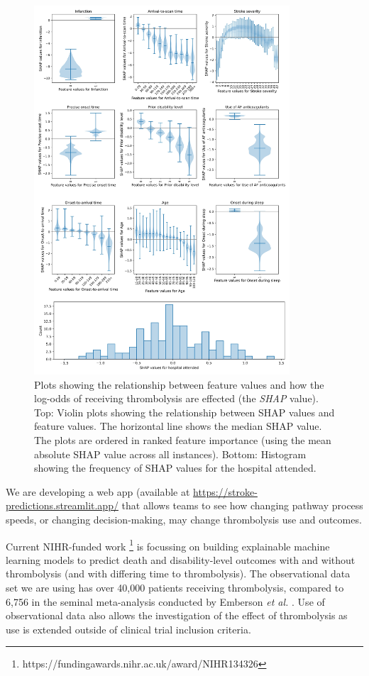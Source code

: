 \begin{figure}
\centering
\includegraphics[width=0.85\textwidth]{./images/combined_shap}
\caption{Plots showing the relationship between feature values and how the log-odds of receiving thrombolysis are effected (the \textit{SHAP} value). Top: Violin plots showing the relationship between SHAP values and feature values. The horizontal line shows the median SHAP value. The plots are ordered in ranked feature importance (using the mean absolute SHAP value across all instances). Bottom: Histogram showing the frequency of SHAP values for the hospital attended.}
\label{fig:shap}
\end{figure}

We are developing a web app (available at \url{https://stroke-predictions.streamlit.app/} that allows teams to see how changing pathway process speeds, or changing decision-making, may change thrombolysis use and outcomes.



Current NIHR-funded work \footnote{https://fundingawards.nihr.ac.uk/award/NIHR134326} is focussing on building explainable machine learning models to predict death and disability-level outcomes with and without thrombolysis (and with differing time to thrombolysis). The observational data set we are using has over 40,000 patients receiving thrombolysis, compared to 6,756 in the seminal meta-analysis conducted by Emberson \textit{et al.} \cite{emberson_effect_2014}. Use of observational data also allows the investigation of the effect of thrombolysis as use is extended outside of clinical trial inclusion criteria. 

